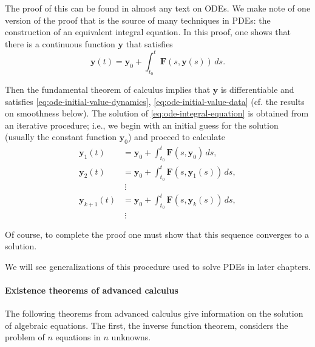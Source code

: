 The proof of this can be found in almost any text on ODEs. We make note of one version of the proof that is the source of many techniques in PDEs: the construction of an equivalent integral equation. In this proof, one shows that there is a continuous function $\mathbf{y}$ that satisfies
\begin{equation}\label{eq:ode-integral-equation}
\mathbf{y}(t)=\mathbf{y}_0+\int_{t_0}^t\mathbf{F}(s,\mathbf{y}(s))\,ds.
\end{equation}

Then the fundamental theorem of calculus implies that $\mathbf{y}$ is differentiable and satisfies \eqref{eq:ode-initial-value-dynamics}, \eqref{eq:ode-initial-value-data} (cf. the results on smoothness below). The solution of \eqref{eq:ode-integral-equation} is obtained from an iterative procedure; i.e., we begin with an initial guess for the solution (usually the constant function $\mathbf{y}_0$) and proceed to calculate
\begin{equation}\label{eq:picard-iteration}
\begin{aligned}
\mathbf{y}_1(t)&=\mathbf{y}_0+\textstyle\int_{t_0}^t\mathbf{F}(s,\mathbf{y}_0)\,ds,\\
\mathbf{y}_2(t)&=\mathbf{y}_0+\textstyle\int_{t_0}^t\mathbf{F}(s,\mathbf{y}_1(s))\,ds,\\
&\ \vdots\\
\mathbf{y}_{k+1}(t)&=\mathbf{y}_0+\textstyle\int_{t_0}^t\mathbf{F}(s,\mathbf{y}_k(s))\,ds,\\
&\ \vdots
\end{aligned}
\end{equation}

Of course, to complete the proof one must show that this sequence converges to a solution.

We will see generalizations of this procedure used to solve PDEs in later chapters.

\paragraph*{Existence theorems of advanced calculus}

The following theorems from advanced calculus give information on the solution of algebraic equations. The first, the inverse function theorem, considers the problem of $n$ equations in $n$ unknowns.

